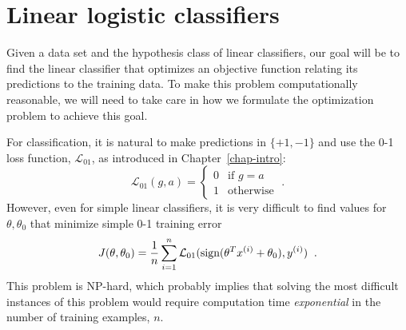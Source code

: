 

\section{Linear logistic classifiers}

\label{sec-lin_log_classifiers}

Given a data set and the hypothesis class of linear classifiers,
our goal will be to find the linear classifier that optimizes an
objective function relating its predictions to the training data.
To make this problem computationally reasonable, we will need to
take care in how we formulate the optimization problem to achieve
this goal.

For classification, it is natural to make predictions in $\{+1, -1\}$
and use the 0-1 loss function, $\mathcal{L}_{01}$, as introduced in Chapter~\ref{chap-intro}:
\[\mathcal{L}_{01}(g, a) = \begin{cases}
    0 & \text{if $g = a$} \\
    1 & \text{otherwise}
  \end{cases} \; .
\]
However, even for simple linear
classifiers, it is very difficult to
find values for $\theta, \theta_0$ that minimize simple 0-1 training error
\[J(\theta, \theta_0) = \frac{1}{n} \sum_{i=1}^n \mathcal{L}_{01}(\text{sign}(\theta^Tx^{(i)} + \theta_0),
  y^{(i)})\;\;.\]
This problem is NP-hard, which probably
implies
that solving the most difficult instances of this problem would
require computation time {\em exponential} in the number of training
examples, $n$.

